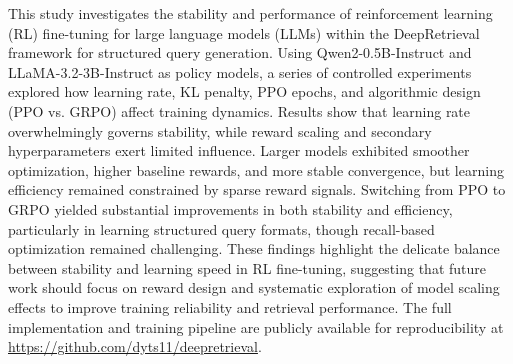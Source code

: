 This study investigates the stability and performance of reinforcement learning (RL) fine-tuning for large language models (LLMs) within the DeepRetrieval framework for structured query generation. Using Qwen2-0.5B-Instruct and LLaMA-3.2-3B-Instruct as policy models, a series of controlled experiments explored how learning rate, KL penalty, PPO epochs, and algorithmic design (PPO vs. GRPO) affect training dynamics. Results show that learning rate overwhelmingly governs stability, while reward scaling and secondary hyperparameters exert limited influence. Larger models exhibited smoother optimization, higher baseline rewards, and more stable convergence, but learning efficiency remained constrained by sparse reward signals. Switching from PPO to GRPO yielded substantial improvements in both stability and efficiency, particularly in learning structured query formats, though recall-based optimization remained challenging. These findings highlight the delicate balance between stability and learning speed in RL fine-tuning, suggesting that future work should focus on reward design and systematic exploration of model scaling effects to improve training reliability and retrieval performance. The full implementation and training pipeline are publicly available for reproducibility at \url{https://github.com/dyts11/deepretrieval}.